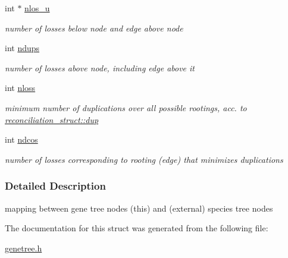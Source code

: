 \begin{DoxyCompactItemize}
\mbox{\label{structreconciliation__struct_af78500445bc598675adbdda9afa2356a}} 
int $\ast$ \hyperlink{structreconciliation__struct_af78500445bc598675adbdda9afa2356a}{nlos\+\_\+u}
\begin{DoxyCompactList}\small\item\em number of losses below node and edge above node \end{DoxyCompactList}\item 
\mbox{\label{structreconciliation__struct_a201c9966439f65c1bbf38eaf55cd0a3e}} 
int \hyperlink{structreconciliation__struct_a201c9966439f65c1bbf38eaf55cd0a3e}{ndups}
\begin{DoxyCompactList}\small\item\em number of losses above node, including edge above it \end{DoxyCompactList}\item 
\mbox{\label{structreconciliation__struct_a9d66971cc3093b68a6145b174e07586a}} 
int \hyperlink{structreconciliation__struct_a9d66971cc3093b68a6145b174e07586a}{nloss}
\begin{DoxyCompactList}\small\item\em minimum number of duplications over all possible rootings, acc. to \hyperlink{structreconciliation__struct_a407dc24ff413c06e6cf323f7e94916f1}{reconciliation\+\_\+struct\+::dup} \end{DoxyCompactList}\item 
\mbox{\label{structreconciliation__struct_ae0fbab68a1f81b74d8e8b35110924c91}} 
int \hyperlink{structreconciliation__struct_ae0fbab68a1f81b74d8e8b35110924c91}{ndcos}
\begin{DoxyCompactList}\small\item\em number of losses corresponding to rooting (edge) that minimizes duplications \end{DoxyCompactList}\end{DoxyCompactItemize}


\subsubsection{Detailed Description}
mapping between gene tree nodes (this) and (external) species tree nodes 

The documentation for this struct was generated from the following file\+:\begin{DoxyCompactItemize}
\item 
\hyperlink{genetree_8h}{genetree.\+h}\end{DoxyCompactItemize}
